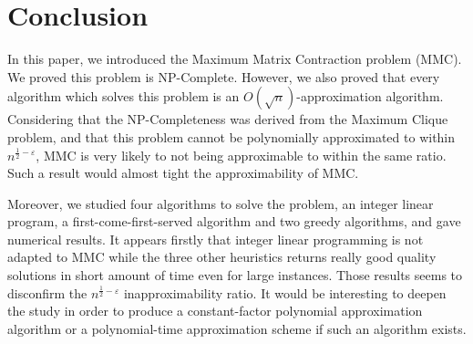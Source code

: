 \section{Conclusion}

In this paper, we introduced the Maximum Matrix Contraction problem (MMC). 
We proved this problem is NP-Complete. However, we also proved that every algorithm which solves this problem is an $O(\sqrt{n})$-approximation algorithm. Considering that the NP-Completeness was derived from the Maximum Clique problem, and that this problem cannot be polynomially approximated to within $n^{\frac{1}{2}-\varepsilon}$, MMC is very likely to not being approximable to within the same ratio. Such a result would almost tight the approximability of MMC.

Moreover, we studied four algorithms to solve the problem, an integer linear program, a first-come-first-served algorithm and two greedy algorithms, and gave numerical results. It appears firstly that integer linear programming is not adapted to MMC while the three other heuristics returns really good quality solutions in short amount of time even for large instances. Those results seems to disconfirm the $n^{\frac{1}{2}-\varepsilon}$ inapproximability ratio. It would be interesting to deepen the study in order to produce a constant-factor polynomial approximation algorithm or a polynomial-time approximation scheme if such an algorithm exists.
